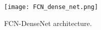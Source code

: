 \begin{figure} [h!]
	\begin{center}
		\texttt{[image: FCN\_dense\_net.png]}
	\end{center}
	\caption{FCN-DenseNet architecture.} 
	\label{fcn}
\end{figure}
%
%
%
